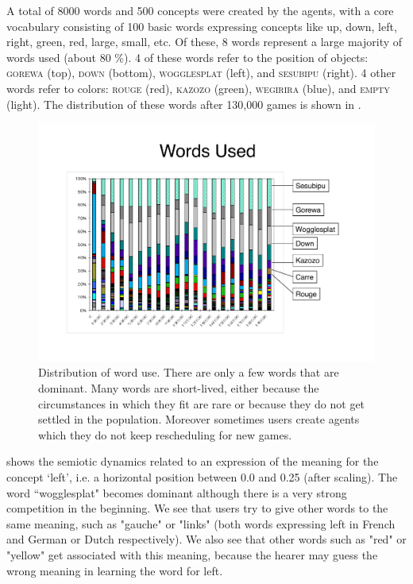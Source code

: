 A total of 8000 words and 500 concepts were created by the agents, with a core vocabulary consisting of 100 basic words expressing concepts like up, down, left, right, green, red, large, small, etc. Of these, 8 words represent a large majority of words used (about 80 \%). 4 of these words refer to the position of objects: \textsc{gorewa} (top), \textsc{down} (bottom), \textsc{wogglesplat} (left), and \textsc{sesubipu} (right). 4 other words refer to colors: \textsc{rouge} (red), \textsc{kazozo} (green), \textsc{wegirira} (blue), and \textsc{empty} (light). The distribution of these words after 130,000 games is shown in . 


\begin{figure}[htbp]
 \centerline{\includegraphics[width=\textwidth]{chap8/figures/words-used.pdf}}
\caption{\label{fig:words-used}Distribution of word use. There are only a few words that are dominant. Many words are 
short-lived, either because the circumstances 
in which they fit are rare or because they do not get settled in the population. Moreover sometimes users create agents 
which they do not keep rescheduling for new games. 
}
\end{figure}

 shows the semiotic dynamics related to an expression of the meaning for the 
concept `left', i.e. a horizontal position 
between 0.0 and 0.25 (after scaling). The word ``wogglesplat" becomes dominant
although there is a very strong competition in the beginning. 
We see that users try to give other words to the same meaning, such as "gauche" or "links" (both words expressing left 
in French and German or Dutch respectively). We also see that other words such as "red" or "yellow" get associated with this 
meaning, because the hearer may guess the wrong meaning in learning the word for left. 

